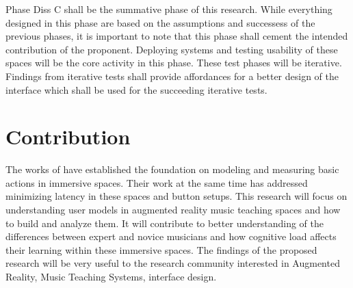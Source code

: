 \documentclass{article}
\begin{document}
Phase Diss C shall be the summative phase of this research. While everything designed in this phase are based on the assumptions and successess of the previous phases, it is important to note that this phase shall cement the intended contribution of the proponent. Deploying systems and testing usability of these spaces will be the core activity in this phase. These test phases will be iterative. Findings from iterative tests shall provide affordances for a better design of the interface which shall be used for the succeeding iterative tests. 
\section{Contribution}
The works of \cite{liao2020button, lee2019geometrically} have established the foundation on modeling and measuring basic actions in immersive spaces. Their work  at the same time has addressed minimizing latency in these spaces and button setups. This research will focus on understanding user models in augmented reality music teaching spaces and how to build and analyze them. It will contribute to better understanding of the differences between expert and novice musicians and how cognitive load affects their learning within these immersive spaces. The findings of the proposed research will be very useful to the research community interested in Augmented Reality, Music Teaching Systems, interface design. 


\end{document}
